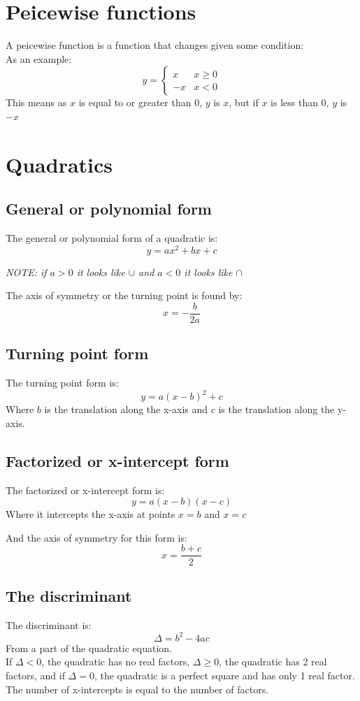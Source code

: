 \documentclass{report}
\begin{document}
\section{Peicewise functions}
A peicewise function is a function that changes given some condition:\\
As an example:
$$
	y = \begin{cases}
		x  & x \geq 0 \\
		-x & x < 0
	\end{cases}
$$
This means as $x$ is equal to or greater than 0, $y$ is $x$, but if $x$ is less than 0, $y$ is $-x$

\section{Quadratics}
\subsection{General or polynomial form}
The general or polynomial form of a quadratic is:
$$
	y = ax^2 + bx + c
$$
\begin{center}
	\emph{NOTE: if $a > 0$ it looks like $\cup$ and $a < 0$ it looks like $\cap$}
\end{center}
The axis of symmetry or the turning point is found by:
$$
	x = -\frac{b}{2a}
$$

\subsection{Turning point form}
The turning point form is:
$$
	y = a(x - b)^2 + c
$$
Where $b$ is the translation along the x-axis and $c$ is the translation along the y-axis.

\subsection{Factorized or x-intercept form}
The factorized or x-intercept form is:
$$
	y = a(x - b)(x - c)
$$
Where it intercepts the x-axis at points $x = b$ and $x = c$

And the axis of symmetry for this form is:
$$
	x = \frac{b + c}{2}
$$

\subsection{The discriminant}
The discriminant is:
$$
	\Delta = b^2 - 4ac
$$
From a part of the quadratic equation.\\
If $\Delta < 0$, the quadratic has no real factors, $\Delta \geq 0$, the quadratic has 2 real factors, and if $\Delta = 0$, the quadratic is a perfect square and has only 1 real factor.  The number of x-intercepts is equal to the number of factors.
\end{document}

